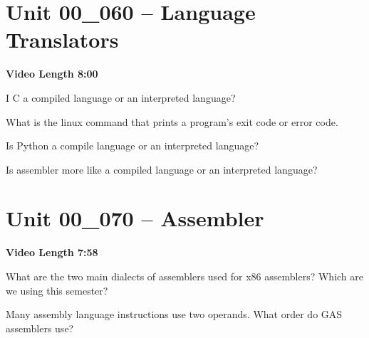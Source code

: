 \documentclass[letterpaper,12pt]{exam}
\newcommand{\unit}{Unit 00}
\begin{document}
\begin{questions}
\section*{\unit\_060 -- Language Translators}
\par{\selectfont\textbf{Video Length 8:00}}
\begin{samepage}
    \question I C a compiled language or an interpreted language?
    \vspace{5mm}
\end{samepage}
\par
\begin{samepage}
    \question 
    \vspace{5mm}
\end{samepage}
\par
 \begin{samepage}
     \question 
     \vspace{5mm}
 \end{samepage}
 \begin{samepage}
     \question What is the linux command that prints a program's exit code or error code.
     \vspace{5mm}
 \end{samepage}
 \par
  \begin{samepage}
      \question Is Python a compile language or an interpreted language?
      \vspace{5mm}
  \end{samepage}
  \par
   \begin{samepage}
       \question Is assembler more like a compiled language or an interpreted language?
       \vspace{5mm}
   \end{samepage}
   \par
    
\section*{\unit\_070 -- Assembler}
\par{\selectfont\textbf{Video Length 7:58}}
\begin{samepage}
    \question What are the two main dialects of assemblers used for x86 assemblers?  Which are we using this semester? 
    \vspace{5mm}
\end{samepage}
\begin{samepage}
    \question Many assembly language instructions use two operands.  What order do GAS assemblers use?
    \vspace{5mm}
\end{samepage}


\end{questions}
\end{document}
